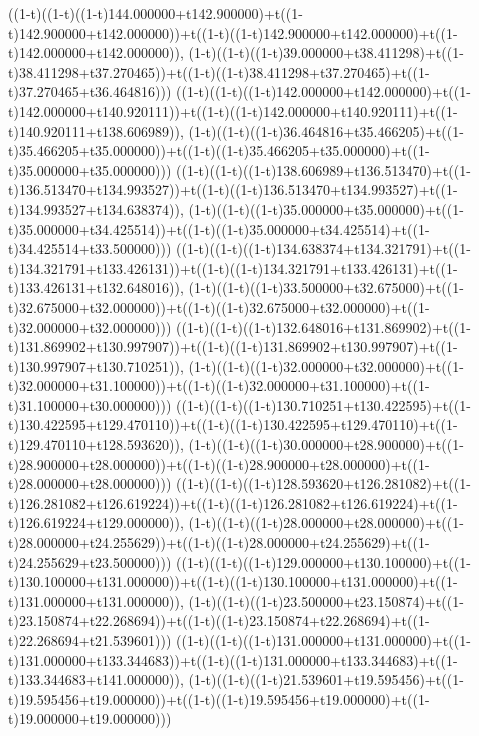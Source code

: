 ((1-t)((1-t)((1-t)144.000000+t142.900000)+t((1-t)142.900000+t142.000000))+t((1-t)((1-t)142.900000+t142.000000)+t((1-t)142.000000+t142.000000)),                                     (1-t)((1-t)((1-t)39.000000+t38.411298)+t((1-t)38.411298+t37.270465))+t((1-t)((1-t)38.411298+t37.270465)+t((1-t)37.270465+t36.464816)))
((1-t)((1-t)((1-t)142.000000+t142.000000)+t((1-t)142.000000+t140.920111))+t((1-t)((1-t)142.000000+t140.920111)+t((1-t)140.920111+t138.606989)),                                     (1-t)((1-t)((1-t)36.464816+t35.466205)+t((1-t)35.466205+t35.000000))+t((1-t)((1-t)35.466205+t35.000000)+t((1-t)35.000000+t35.000000)))
((1-t)((1-t)((1-t)138.606989+t136.513470)+t((1-t)136.513470+t134.993527))+t((1-t)((1-t)136.513470+t134.993527)+t((1-t)134.993527+t134.638374)),                                     (1-t)((1-t)((1-t)35.000000+t35.000000)+t((1-t)35.000000+t34.425514))+t((1-t)((1-t)35.000000+t34.425514)+t((1-t)34.425514+t33.500000)))
((1-t)((1-t)((1-t)134.638374+t134.321791)+t((1-t)134.321791+t133.426131))+t((1-t)((1-t)134.321791+t133.426131)+t((1-t)133.426131+t132.648016)),                                     (1-t)((1-t)((1-t)33.500000+t32.675000)+t((1-t)32.675000+t32.000000))+t((1-t)((1-t)32.675000+t32.000000)+t((1-t)32.000000+t32.000000)))
((1-t)((1-t)((1-t)132.648016+t131.869902)+t((1-t)131.869902+t130.997907))+t((1-t)((1-t)131.869902+t130.997907)+t((1-t)130.997907+t130.710251)),                                     (1-t)((1-t)((1-t)32.000000+t32.000000)+t((1-t)32.000000+t31.100000))+t((1-t)((1-t)32.000000+t31.100000)+t((1-t)31.100000+t30.000000)))
((1-t)((1-t)((1-t)130.710251+t130.422595)+t((1-t)130.422595+t129.470110))+t((1-t)((1-t)130.422595+t129.470110)+t((1-t)129.470110+t128.593620)),                                     (1-t)((1-t)((1-t)30.000000+t28.900000)+t((1-t)28.900000+t28.000000))+t((1-t)((1-t)28.900000+t28.000000)+t((1-t)28.000000+t28.000000)))
((1-t)((1-t)((1-t)128.593620+t126.281082)+t((1-t)126.281082+t126.619224))+t((1-t)((1-t)126.281082+t126.619224)+t((1-t)126.619224+t129.000000)),                                     (1-t)((1-t)((1-t)28.000000+t28.000000)+t((1-t)28.000000+t24.255629))+t((1-t)((1-t)28.000000+t24.255629)+t((1-t)24.255629+t23.500000)))
((1-t)((1-t)((1-t)129.000000+t130.100000)+t((1-t)130.100000+t131.000000))+t((1-t)((1-t)130.100000+t131.000000)+t((1-t)131.000000+t131.000000)),                                     (1-t)((1-t)((1-t)23.500000+t23.150874)+t((1-t)23.150874+t22.268694))+t((1-t)((1-t)23.150874+t22.268694)+t((1-t)22.268694+t21.539601)))
((1-t)((1-t)((1-t)131.000000+t131.000000)+t((1-t)131.000000+t133.344683))+t((1-t)((1-t)131.000000+t133.344683)+t((1-t)133.344683+t141.000000)),                                     (1-t)((1-t)((1-t)21.539601+t19.595456)+t((1-t)19.595456+t19.000000))+t((1-t)((1-t)19.595456+t19.000000)+t((1-t)19.000000+t19.000000)))
